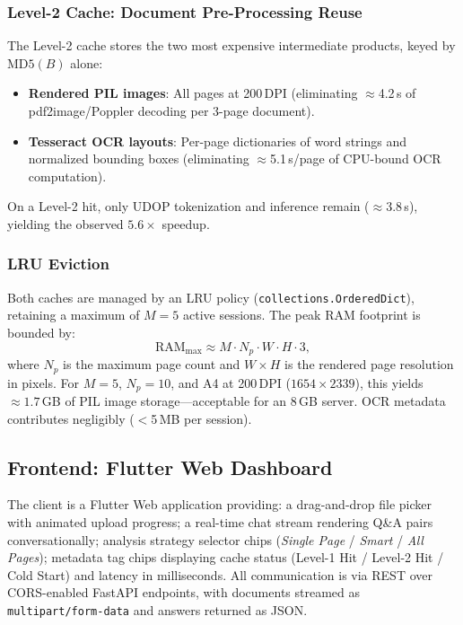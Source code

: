 \documentclass[conference]{IEEEtran}
\begin{document}
\subsubsection{Level-2 Cache: Document Pre-Processing Reuse}

The Level-2 cache stores the two most expensive intermediate products, keyed by
$\text{MD5}(B)$ alone:
\begin{itemize}
    \item \textbf{Rendered PIL images}: All pages at 200\,DPI (eliminating
          ${\approx}$4.2\,s of pdf2image/Poppler decoding per 3-page document).
    \item \textbf{Tesseract OCR layouts}: Per-page dictionaries of word strings
          and normalized bounding boxes (eliminating ${\approx}$5.1\,s/page
          of CPU-bound OCR computation).
\end{itemize}
On a Level-2 hit, only UDOP tokenization and inference remain
(${\approx}$3.8\,s), yielding the observed $5.6\times$ speedup.

\subsubsection{LRU Eviction}

Both caches are managed by an LRU policy
(\texttt{collections.OrderedDict}), retaining a maximum of $M{=}5$ active
sessions. The peak RAM footprint is bounded by:
\begin{equation}
    \text{RAM}_{\max} \approx M \cdot N_p \cdot W \cdot H \cdot 3,
    \label{eq:ram}
\end{equation}
where $N_p$ is the maximum page count and $W{\times}H$ is the rendered
page resolution in pixels. For $M{=}5$, $N_p{=}10$, and A4 at 200\,DPI
($1654{\times}2339$), this yields ${\approx}1.7$\,GB of PIL image
storage---acceptable for an 8\,GB server. OCR metadata contributes
negligibly ($<$5\,MB per session).

\subsection{Frontend: Flutter Web Dashboard}

The client is a Flutter Web application providing: a drag-and-drop file picker
with animated upload progress; a real-time chat stream rendering Q\&A pairs
conversationally; analysis strategy selector chips (\emph{Single Page} /
\emph{Smart} / \emph{All Pages}); metadata tag chips displaying cache status
(Level-1 Hit / Level-2 Hit / Cold Start) and latency in milliseconds. All
communication is via REST over CORS-enabled FastAPI endpoints, with documents
streamed as \texttt{multipart/form-data} and answers returned as JSON.
\end{document}
